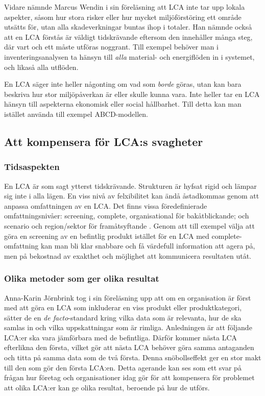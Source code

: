 \documentclass{article}
\begin{document}
Vidare nämnde Marcus Wendin i sin föreläsning att LCA inte tar upp lokala aspekter, såsom hur stora risker eller hur mycket miljöförstöring ett område utsätts för, utan alla skadeverkningar buntas ihop i totaler. Han nämnde också att en LCA förstås är väldigt tidskrävande eftersom den innehåller många steg, där vart och ett måste utföras noggrant. Till exempel behöver man i inventeringsanalysen ta hänsyn till \emph{alla} material- och energiflöden in i systemet, och likaså alla utflöden.

En LCA säger inte heller någonting om vad som \emph{borde} göras, utan kan bara beskriva hur stor miljö\-påverkan är eller skulle kunna vara. Inte heller tar en LCA hänsyn till aspekterna ekonomisk eller social hållbarhet. Till detta kan man istället använda till exempel ABCD-modellen.

\subsection{Att kompensera för LCA:s svagheter}

\subsubsection{Tidsaspekten}

En LCA är som sagt ytterst tidskrävande. Strukturen är hyfsat rigid och lämpar sig inte i alla lägen. En viss nivå av felxibilitet kan ändå åstadkommas genom att anpassa omfattningen av en LCA. Det finns vissa föredefinierade omfattningsnivåer:  screening, complete, organisational för bakåtblickande; och scenario och region/sektor för framåtsyftande . Genom att till exempel välja att göra en screening av en befintlig produkt istället för en LCA med complete-omfattning kan man bli klar snabbare och få värdefull information att agera på, men på bekostnad av exakthet och möjlighet att kommunicera resultaten utåt.

\subsubsection{Olika metoder som ger olika resultat}

Anna-Karin Jörnbrink tog i sin föreläsning upp att om en organisation är först med att göra en LCA som inkluderar en viss produkt eller produktkategori, sätter de en \emph{de facto}-standard kring vilka data som är relevanta, hur de ska samlas in och vilka uppskattningar som är rimliga. Anledningen är att följande LCA:er ska vara jämförbara med de befintliga. Därför kommer nästa LCA efterlikna den första, vilket gör att nästa LCA behöver göra samma antaganden och titta på samma data som de två första. Denna snöbollseffekt ger en stor makt till den som gör den första LCA:en. Detta agerande kan ses som ett svar på frågan hur företag och organisationer idag gör för att kompensera för problemet att olika LCA:er kan ge olika resultat, beroende på hur de utförs.
\end{document}
